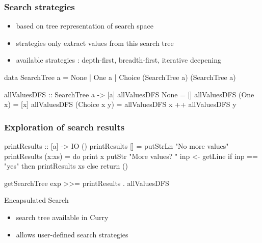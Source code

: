\documentclass[
,hyperref={pdfpagelabels=false}
]{beamer}
\begin{document}
\begin{frame}[fragile]%
\frametitle{Search strategies}

\begin{itemize}
  \item based on tree representation of search space
  \item strategies only extract values from this search tree
  \item available strategies : depth-first, breadth-first, iterative deepening
\end{itemize}

\begin{haskell}[SearchTree]
data SearchTree a
  = None
  | One a
  | Choice (SearchTree a)
           (SearchTree a)
\end{haskell}

\begin{haskell}
allValuesDFS :: SearchTree a -> [a]
allValuesDFS None         = []
allValuesDFS (One      x) = [x]
allValuesDFS (Choice x y) = allValuesDFS x ++ allValuesDFS y
\end{haskell}

\end{frame}

\begin{frame}[fragile]%
\frametitle{Exploration of search results}
\begin{haskell}
printResults :: [a] -> IO ()
printResults []     = putStrLn "No more values"
printResults (x:xs) = do print x
                         putStr "More values? "
                         inp <- getLine
                         if inp == "yes" then printResults xs
                                         else return ()
                                         
getSearchTree exp >>= printResults . allValuesDFS %
\end{haskell}


\begin{curryblock}{Encapsulated Search}
\begin{itemize}
\item search tree available in Curry
\item allows user-defined search strategies
\end{itemize}
\end{curryblock}
\end{frame}
\end{document}
